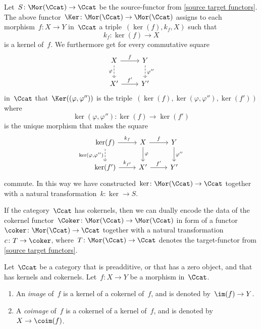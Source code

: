 \begin{remark*}
\begin{enumerate}
      Let~$S \colon \Mor(\Ccat) \to \Ccat$ be the source-functor from \cref{source target functors}.
      The above functor~$\Ker \colon \Mor(\Ccat) \to \Mor(\Ccat)$ assigns to each morphism~$f \colon X \to Y$ in~$\Ccat$ a triple~$(\ker(f), k_f, X)$ such that
      \[
                k_f
        \colon  \ker(f)
        \to     X
      \]
      is a kernel of~$f$.
      We furthermore get for every commutative square
      \[
        \begin{tikzcd}
            X
            \arrow{r}[above]{f}
            \arrow[dashed]{d}[left]{\varphi}
          & Y
            \arrow[dashed]{d}[right]{\varphi''}
          \\
            X'
            \arrow{r}[above]{f'}
          & Y'
        \end{tikzcd}
      \]
      in~$\Ccat$ that~$\Ker((\varphi,\varphi''))$ is the triple~$(\ker(f), \ker(\varphi,\varphi''), \ker(f'))$ where
      \[
                \ker(\varphi, \varphi'')
        \colon  \ker(f)
        \to     \ker(f')
      \]
      is the unique morphism that makes the square
      \[
        \begin{tikzcd}
            \ker(f)
            \arrow{r}[above]{k_f}
            \arrow[dashed]{d}[left]{\ker(\varphi, \varphi'')}
          & X
            \arrow{r}[above]{f}
            \arrow{d}[right]{\varphi}
          & Y
            \arrow{d}[right]{\varphi''}
          \\
            \ker(f')
            \arrow{r}[above]{k_{f'}}
          & X'
            \arrow{r}[above]{f'}
          & Y'
        \end{tikzcd}
      \]
      commute.
      In this way we have constructed~$\ker \colon \Mor(\Ccat) \to \Ccat$ together with a natural transformation~$k \colon \ker \to S$.
      
      If the category~$\Ccat$ has cokernels, then we can dually encode the data of the cokernel functor~$\Coker \colon \Mor(\Ccat) \to \Mor(\Ccat)$ in form of a functor~$\coker \colon \Mor(\Ccat) \to \Ccat$ together with a natural transformation~$c \colon T \to \coker$, where~$T \colon \Mor(\Ccat) \to \Ccat$ denotes the target-functor from \cref{source target functors}.
  \end{enumerate}
\end{remark*}


\begin{definition}
  Let~$\Ccat$ be a category that is preadditive, or that has a zero object, and that has kernels and cokernels.
  Let~$f \colon X \to Y$ be a morphism in~$\Ccat$.
  \begin{enumerate}
    \item
      An \emph{image} of~$f$ is a kernel of a cokernel of~$f$, and is denoted by~$\im(f) \to Y$.
    \item
      A \emph{coimage} of~$f$ is a cokernel of a kernel of~$f$, and is denoted by~$X \to \coim(f)$.
  \end{enumerate}
\end{definition}


